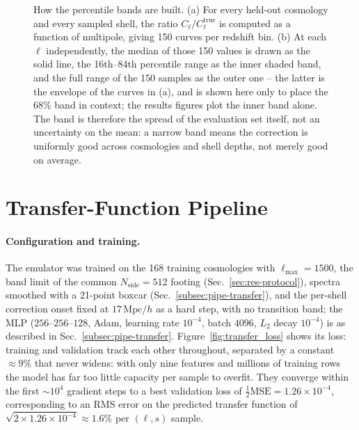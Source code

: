 \documentclass{report}
\begin{document}
\begin{figure}[h!]
\caption{How the percentile bands are built. (a) For every held-out cosmology and every
sampled shell, the ratio \mbox{$C_\ell/C_\ell^{\mathrm{true}}$} is computed as a function of
multipole, giving 150 curves per redshift bin. (b) At each \mbox{$\ell$} independently, the
median of those 150 values is drawn as the solid line, the 16th--84th percentile range as the
inner shaded band, and the full range of the 150 samples as the outer one -- the latter is
the envelope of the curves in (a), and is shown here only to place the \mbox{$68\%$} band in
context; the results figures plot the inner band alone. The band is therefore the spread of
the evaluation set itself, not an uncertainty on the mean: a narrow band means the correction
is uniformly good across cosmologies and shell depths, not merely good on average.}
\label{fig:band_construction}
\end{figure}

\clearpage
\section{Transfer-Function Pipeline}
\label{sec:res-transfer}

\paragraph{Configuration and training.} The emulator was trained on the 168 training cosmologies with $\ell_{\max}=1500$, the band limit of the common $N_{\mathrm{side}}=512$ footing (Sec.~\ref{sec:res-protocol}), spectra smoothed with a 21-point boxcar (Sec.~\ref{subsec:pipe-transfer}), and the per-shell correction onset fixed at $17\,\mathrm{Mpc}/h$ as a hard step, with no transition band; the MLP ($256$--$256$--$128$, Adam, learning rate $10^{-4}$, batch $4096$, $L_2$ decay $10^{-4}$) is as described in Sec.~\ref{subsec:pipe-transfer}. Figure~\ref{fig:transfer_loss} shows its loss: training and validation track each other throughout, separated by a constant \mbox{$\approx 9\%$} that never widens: with only nine features and millions of training rows the model has far too little capacity per sample to overfit. They converge within the first \mbox{$\sim 10^4$} gradient steps to a best validation loss of \mbox{$\tfrac12\mathrm{MSE} = 1.26\times10^{-4}$}, corresponding to an RMS error on the predicted transfer function of \mbox{$\sqrt{2 \times 1.26\times10^{-4}} \approx 1.6\%$} per \mbox{$(\ell, s)$} sample.
\end{document}
